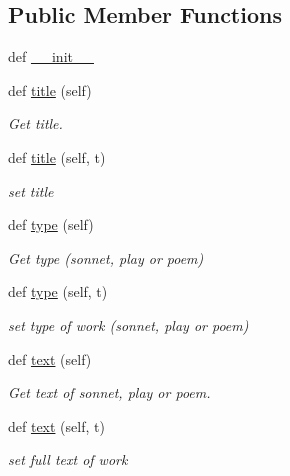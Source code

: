 \subsection*{Public Member Functions}
\begin{DoxyCompactItemize}
\item 
def \hyperlink{classbridges_1_1data__src__dependent_1_1shakespeare_1_1_shakespeare_a22b3c0d1bcce2f1c7f7845b9db8a8610}{\+\_\+\+\_\+init\+\_\+\+\_\+}
\item 
def \hyperlink{classbridges_1_1data__src__dependent_1_1shakespeare_1_1_shakespeare_a3bd228852c9e0fc4653ada17f1803c15}{title} (self)
\begin{DoxyCompactList}\small\item\em Get title. \end{DoxyCompactList}\item 
def \hyperlink{classbridges_1_1data__src__dependent_1_1shakespeare_1_1_shakespeare_abbf3b79e27e5e4afc1040a340dbf4d49}{title} (self, t)
\begin{DoxyCompactList}\small\item\em set title \end{DoxyCompactList}\item 
def \hyperlink{classbridges_1_1data__src__dependent_1_1shakespeare_1_1_shakespeare_ae2499dd686160849220edc662246e42a}{type} (self)
\begin{DoxyCompactList}\small\item\em Get type (sonnet, play or poem) \end{DoxyCompactList}\item 
def \hyperlink{classbridges_1_1data__src__dependent_1_1shakespeare_1_1_shakespeare_a9b4489402fda80ec8360bb17ad3d0af9}{type} (self, t)
\begin{DoxyCompactList}\small\item\em set type of work (sonnet, play or poem) \end{DoxyCompactList}\item 
def \hyperlink{classbridges_1_1data__src__dependent_1_1shakespeare_1_1_shakespeare_a588e767fe0f474440f2b9a1fda8ede96}{text} (self)
\begin{DoxyCompactList}\small\item\em Get text of sonnet, play or poem. \end{DoxyCompactList}\item 
def \hyperlink{classbridges_1_1data__src__dependent_1_1shakespeare_1_1_shakespeare_af81f61dc7578547f5ed42792fc36e37a}{text} (self, t)
\begin{DoxyCompactList}\small\item\em set full text of work \end{DoxyCompactList}\end{DoxyCompactItemize}


